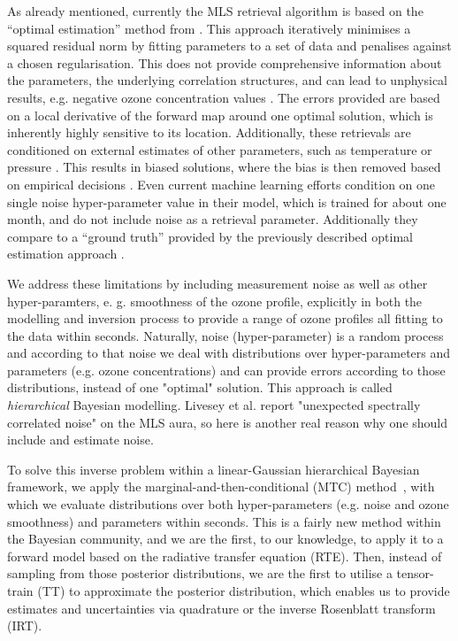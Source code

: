 As already mentioned, currently the MLS retrieval algorithm \cite{livesey2006retrieval} is based on the ``optimal estimation'' method from \cite{rodgers1976retrieval}.
This approach iteratively minimises a squared residual norm by fitting parameters to a set of data and penalises against a chosen regularisation.
This does not provide comprehensive information about the parameters, the underlying correlation structures, and can lead to unphysical results, e.g. negative ozone concentration values \cite{MLSdata}.
The errors provided are based on a local derivative of the forward map around one optimal solution, which is inherently highly sensitive to its location.
Additionally, these retrievals are conditioned on external estimates of other parameters, such as temperature or pressure \cite{livesey2006retrieval}.
This results in biased solutions, where the bias is then removed based on empirical decisions \cite{livesey2008ozonecarbonmono, Froidevaux2008snrozone}.
Even current machine learning efforts condition on one single noise hyper-parameter value in their model, which is trained for about one month, and do not include noise as a retrieval parameter.
Additionally they compare to a ``ground truth'' provided by the previously described optimal estimation approach \cite{werner2023machlearn, bojkov2008NeuralNet}.

We address these limitations by including measurement noise as well as other hyper-paramters, e. g. smoothness of the ozone profile, explicitly in both the modelling and inversion process to provide a range of ozone profiles all fitting to the data within seconds.
Naturally, noise (hyper-parameter) is a random process and according to that noise we deal with distributions over hyper-parameters and parameters (e.g. ozone concentrations) and can provide errors according to those distributions, instead of one "optimal" solution.
This approach is called \textit{hierarchical} Bayesian modelling.
Livesey et al. \cite{livesey2006retrieval} report "unexpected spectrally correlated noise" on the MLS aura, so here is another real reason why one should include and estimate noise.

To solve this inverse problem within a linear-Gaussian hierarchical Bayesian framework, we apply the marginal-and-then-conditional (MTC) method~\cite{fox2016fast}, with which we evaluate distributions over both hyper-parameters (e.g. noise and ozone smoothness) and parameters within seconds.
This is a fairly new method within the Bayesian community, and we are the first, to our knowledge, to apply it to a forward model based on the radiative transfer equation (RTE).
Then, instead of sampling from those posterior distributions, we are the first to utilise a tensor-train (TT) to approximate the posterior distribution, which enables us to provide estimates and uncertainties via quadrature or the inverse Rosenblatt transform (IRT).


